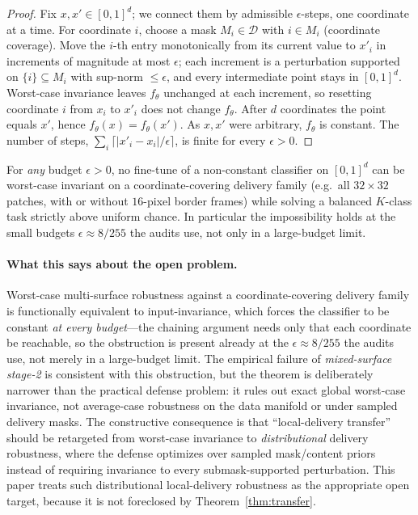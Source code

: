 \begin{proof}
Fix $x, x' \in [0,1]^d$; we connect them by admissible $\epsilon$-steps,
one coordinate at a time. For coordinate $i$, choose a mask $M_i \in
\mathcal{D}$ with $i \in M_i$ (coordinate coverage). Move the $i$-th entry
monotonically from its current value to $x'_i$ in increments of magnitude at
most $\epsilon$; each increment is a perturbation supported on
$\{i\} \subseteq M_i$ with sup-norm $\leq \epsilon$, and every intermediate
point stays in $[0,1]^d$. Worst-case invariance leaves $f_\theta$ unchanged at
each increment, so resetting coordinate $i$ from $x_i$ to $x'_i$ does not
change $f_\theta$. After $d$ coordinates the point equals $x'$, hence
$f_\theta(x) = f_\theta(x')$. As $x, x'$ were arbitrary, $f_\theta$ is
constant. The number of steps, $\sum_i \lceil |x'_i - x_i|/\epsilon \rceil$,
is finite for every $\epsilon > 0$.
\end{proof}

\begin{corollary}
\label{cor:no-free-lunch}
For \emph{any} budget $\epsilon > 0$, no fine-tune of a non-constant
classifier on $[0,1]^d$ can be worst-case invariant on a coordinate-covering
delivery family (e.g.\ all $32\times 32$ patches, with or without $16$-pixel
border frames) while solving a balanced $K$-class task strictly above uniform
chance. In
particular the impossibility holds at the small budgets $\epsilon \approx
8/255$ the audits use, not only in a large-budget limit.
\end{corollary}

\paragraph{What this says about the open problem.} Worst-case multi-surface
robustness against a coordinate-covering delivery family is functionally
equivalent to input-invariance, which forces the classifier to be constant
\emph{at every budget}---the chaining argument needs only that each coordinate
be reachable, so the obstruction is present already at the $\epsilon \approx
8/255$ the audits use, not merely in a large-budget limit. The empirical
failure of \emph{mixed-surface stage-2} is consistent with this obstruction,
but the theorem is deliberately narrower than the practical defense problem:
it rules out exact global worst-case invariance, not average-case robustness on
the data manifold or under sampled delivery masks. The constructive consequence
is that ``local-delivery transfer'' should be retargeted from worst-case
invariance to \emph{distributional} delivery robustness, where the defense
optimizes over sampled mask/content priors instead of requiring invariance to
every submask-supported perturbation. This paper treats such distributional
local-delivery robustness as the appropriate open target, because it is not
foreclosed by Theorem~\ref{thm:transfer}.

